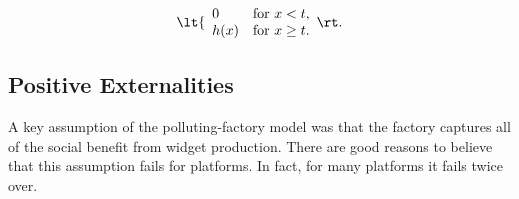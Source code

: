 \begin{equation}
\lt\{\begin{array}{ll}
	0 & \mbox{for $x <t$}, \\
	h(x) & \mbox{for $x \ge t$}.
\end{array}\rt.
\end{equation}


\subsection{Positive Externalities}

A key assumption of the polluting-factory model was that the factory captures all of the social benefit from widget production. There are good reasons to believe that this assumption fails for platforms. In fact, for many platforms it fails twice over.

